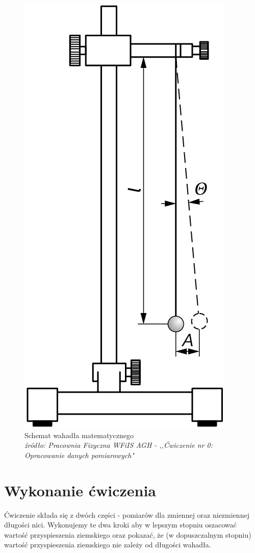 \documentclass[a4paper,12pts]{article}
\begin{document}
		\begin{figure}[!h]
			\centering
			\includegraphics[scale=0.12]{wah.png}
			\caption{\centering Schemat wahadła matematycznego \\ { \textit{źródło: Pracownia Fizyczna WFiIS AGH - ,,Ćwiczenie nr 0: Opracowanie danych pomiarowych"}}}
			\label{wahadlo}
		\end{figure}
	\newpage
	
	
	\section{Wykonanie ćwiczenia}
	Ćwiczenie składa się z dwóch części - pomiarów dla zmiennej oraz niezmiennej długości nici. Wykonujemy te dwa kroki aby w lepszym stopniu oszacować wartość przyspieszenia ziemskiego oraz pokazać, że (w dopuszczalnym stopniu) wartość przyspieszenia ziemskiego nie zależy od długości wahadła.
\end{document}

